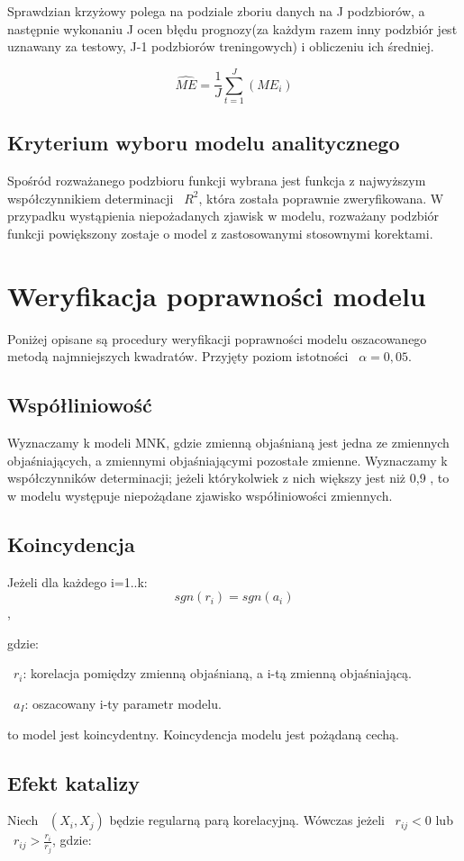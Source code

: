 \documentclass{article}
\begin{document}
Sprawdzian krzyżowy polega na podziale zboriu danych na J podzbiorów, a następnie wykonaniu J ocen błędu prognozy(za każdym razem inny podzbiór jest uznawany za testowy, J-1 podzbiorów treningowych) i obliczeniu ich średniej.

\[\hat{ME}= \frac{1}{J} \sum_{t=1}^{J} ( ME_i ) \]

\subsection{Kryterium wyboru modelu analitycznego}
Spośród rozważanego podzbioru funkcji wybrana jest funkcja z najwyższym współczynnikiem determinacji ~$R^2$, która została poprawnie zweryfikowana. W przypadku wystąpienia niepożadanych zjawisk w modelu, rozważany podzbiór funkcji powiększony zostaje o model z zastosowanymi stosownymi korektami.


\newpage
\section{Weryfikacja poprawności modelu}
Poniżej opisane są procedury weryfikacji poprawności modelu oszacowanego metodą najmniejszych kwadratów. Przyjęty poziom istotności ~$\alpha=0,05$.

\subsection{Współliniowość}
Wyznaczamy k modeli MNK, gdzie zmienną objaśnianą jest jedna ze zmiennych objaśniających, a zmiennymi objaśniającymi pozostałe zmienne. Wyznaczamy k współczynników determinacji; jeżeli którykolwiek z nich większy jest niż 0,9 , to w modelu występuje niepożądane zjawisko współiniowości zmiennych.

\subsection{Koincydencja}
Jeżeli dla każdego i=1..k:
\[sgn(r_i) = sgn(a_i)\],

gdzie:

~$r_i$: korelacja pomiędzy zmienną objaśnianą, a i-tą zmienną objaśniającą.

~$a_I$: oszacowany i-ty parametr modelu.

to model jest koincydentny. Koincydencja modelu jest pożądaną cechą.

\subsection{Efekt katalizy}
Niech ~$(X_i, X_j)$ będzie regularną parą korelacyjną. Wówczas jeżeli ~$r_{ij} < 0$ lub ~$r_{ij} > \frac{r_i}{r_j}$, gdzie:
\end{document}
